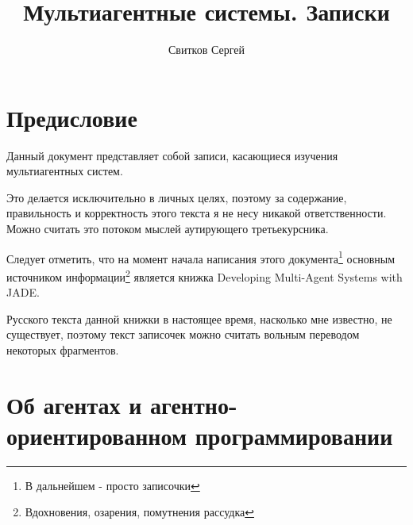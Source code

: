 \documentclass[12pt]{report}
\title{Мультиагентные системы. Записки}
\author{Свитков Сергей}
\begin{document}
    \maketitle
    
    \chapter *{Предисловие}
        Данный документ представляет собой записи, касающиеся изучения мультиагентных систем.
        
        Это делается исключительно в личных целях, поэтому за содержание, правильность и корректность этого текста я не несу никакой ответственности. Можно считать это потоком мыслей аутирующего третьекурсника.
        
        Следует отметить, что на момент начала написания этого документа\footnote{В дальнейшем - просто записочки} основным источником информации\footnote{Вдохновения, озарения, помутнения рассудка} является книжка Developing Multi-Agent Systems with JADE\cite{jade}.
        
        Русского текста данной книжки в настоящее время, насколько мне известно, не существует, поэтому текст записочек можно считать вольным переводом некоторых фрагментов.
    
    
    
    \tableofcontents
    
    
        
    \chapter {Об агентах и агентно-ориентированном программировании}
\end{document}
